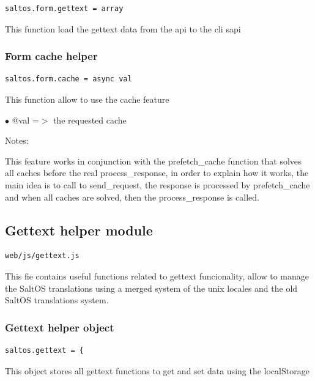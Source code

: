 \documentclass[a4paper]{article}
\begin{document}
\begin{lstlisting}
saltos.form.gettext = array
\end{lstlisting}

This function load the gettext data from the api to the cli sapi

\hypertarget{toc234}{}
\subsubsection{Form cache helper}

\begin{lstlisting}
saltos.form.cache = async val
\end{lstlisting}

This function allow to use the cache feature

\begin{compactitem}
\item[\color{myblue}$\bullet$] @val =$>$ the requested cache
\end{compactitem}

Notes:

This feature works in conjunction with the prefetch\_cache function that
solves all caches before the real process\_response, in order to explain
how it works, the main idea is to call to send\_request, the response is
processed by prefetch\_cache and when all caches are solved, then the
process\_response is called.

\hypertarget{toc235}{}
\subsection{Gettext helper module}

\begin{lstlisting}
web/js/gettext.js
\end{lstlisting}

This fie contains useful functions related to gettext funcionality, allow to manage the
SaltOS translations using a merged system of the unix locales and the old SaltOS translations
system.

\hypertarget{toc236}{}
\subsubsection{Gettext helper object}

\begin{lstlisting}
saltos.gettext = {
\end{lstlisting}

This object stores all gettext functions to get and set data using the localStorage
\end{document}
